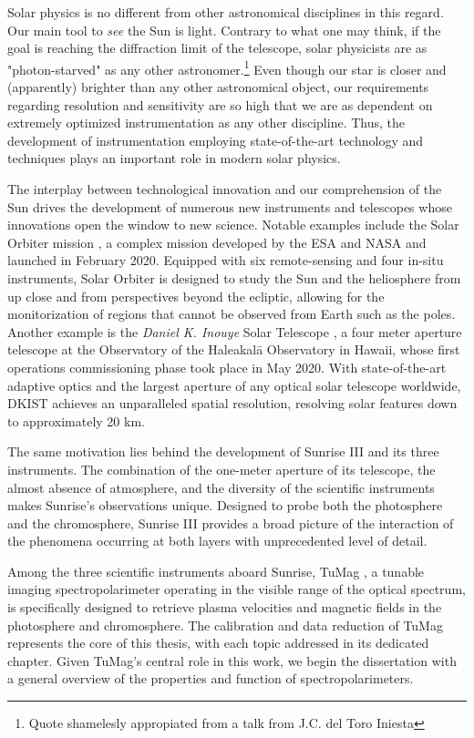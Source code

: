 Solar physics is no different from other astronomical disciplines in this regard. Our main tool to \textit{see} the Sun is light. Contrary to what one may think, if the goal is reaching the diffraction limit of the telescope, solar physicists are as "photon-starved" as any other astronomer.\footnote{Quote shamelesly appropiated from a talk from J.C. del Toro Iniesta} Even though our star is closer and (apparently) brighter than any other astronomical object, our requirements regarding resolution and sensitivity are so high that we are as dependent on extremely optimized instrumentation as any other discipline. Thus, the development of instrumentation employing state-of-the-art technology and techniques plays an important role in modern solar physics.

The interplay between technological innovation and our comprehension of the Sun drives the development of numerous new instruments and telescopes whose innovations open the window to new science. Notable examples include the Solar Orbiter mission \citep{SO}, a complex mission developed by the ESA and NASA and launched in February 2020. Equipped with six remote-sensing and four in-situ instruments, Solar Orbiter is designed to study the Sun and the heliosphere from up close and from perspectives beyond the ecliptic, allowing for the monitorization of regions that cannot be observed from Earth such as the poles. Another example is the \textit{Daniel K. Inouye} Solar Telescope \citep[DKIST;][]{DKIST}, a four meter aperture telescope at the Observatory of the Haleakal\=a Observatory in Hawaii, whose first operations commissioning phase took place in May 2020. With state-of-the-art adaptive optics and the largest aperture of any optical solar telescope worldwide, DKIST achieves an unparalleled spatial resolution, resolving solar features down to approximately 20 km. 

The same motivation lies behind the development of Sunrise III and its three instruments. The combination of the one-meter aperture of its telescope, the almost absence of atmosphere, and the diversity of the scientific instruments makes Sunrise's observations unique. Designed to probe both the photosphere and the chromosphere, Sunrise III provides a broad picture of the interaction of the phenomena occurring at both layers with unprecedented level of detail.

Among the three scientific instruments aboard Sunrise, TuMag \citep{tumag}, a tunable imaging spectropolarimeter operating in the visible range of the optical spectrum, is specifically designed to retrieve plasma velocities and magnetic fields in the photosphere and chromosphere. The calibration and data reduction of TuMag represents the core of this thesis, with each topic addressed in its dedicated chapter. Given TuMag’s central role in this work, we begin the dissertation with a general overview of the properties and function of spectropolarimeters.


